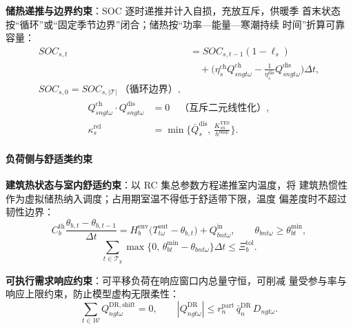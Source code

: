 \textbf{储热递推与边界约束}：SOC 逐时递推并计入自损，充放互斥，供暖季
首末状态按“循环”或“固定季节边界”闭合；储热按“功率—能量—寒潮持续
时间”折算可靠容量：
\begin{equation}
\label{eq:storage}
\begin{aligned}
SOC_{s,t}&=SOC_{s,t-1}(1-\ell_s)\\[-2pt]
&\quad+\bigl(\eta^{\mathrm{ch}}_s Q^{\mathrm{ch}}_{sngt\omega}
-\tfrac{1}{\eta^{\mathrm{dis}}_s}Q^{\mathrm{dis}}_{sngt\omega}\bigr)\Delta t,
\\[-2pt]
SOC_{s,0}=SOC_{s,|\mathcal T|}\ \text{（循环边界）},
\end{aligned}
\end{equation}
\begin{equation*}
\begin{aligned}
Q^{\mathrm{ch}}_{sngt\omega}\cdot Q^{\mathrm{dis}}_{sngt\omega}&=0
\quad\text{（互斥二元线性化）},\\[-2pt]
\kappa^{\mathrm{rel}}_{s}
&=\min\!\Big\{\bar Q^{\mathrm{dis}}_s,\,
\tfrac{K^{\mathrm{TES}}_{sn}}{h^{\mathrm{snap}}}\Big\}.
\end{aligned}
\end{equation*}

\paragraph{负荷侧与舒适类约束}

\textbf{建筑热状态与室内舒适约束}：以 RC 集总参数方程递推室内温度，将
建筑热惯性作为虚拟储热纳入调度；占用期室温不得低于舒适带下限，温度
偏差度时不超过韧性边界：
\begin{equation}
\label{eq:building}
C^{\mathrm{th}}_{b}\frac{\theta_{b,t}-\theta_{b,t-1}}{\Delta t}
=H^{\mathrm{env}}_{b}\bigl(T^{\mathrm{out}}_{t\omega}-\theta_{b,t}\bigr)
+Q^{\mathrm{in}}_{bnt\omega},\qquad
\theta_{bnt\omega}\ge\theta^{\mathrm{min}}_{bt},
\end{equation}
\begin{equation}
\label{eq:degree-hour}
\sum_{t\in\mathcal T_y}\max\bigl\{0,\,
\theta^{\mathrm{min}}_{bt}-\theta_{bnt\omega}\bigr\}\Delta t
\le \Xi^{\mathrm{tol}}_{b}.
\end{equation}

\textbf{可执行需求响应约束}：可平移负荷在响应窗口内总量守恒，可削减
量受参与率与响应上限约束，防止模型虚构无限柔性：
\begin{equation}
\label{eq:dr}
\sum_{t\in\mathcal W}Q^{\mathrm{DR,shift}}_{ngt\omega}=0,\qquad
|Q^{\mathrm{DR}}_{ngt\omega}|
\le r^{\mathrm{part}}_{n}\,\bar q^{\mathrm{DR}}_{n}\,D_{ngt\omega}.
\end{equation}

